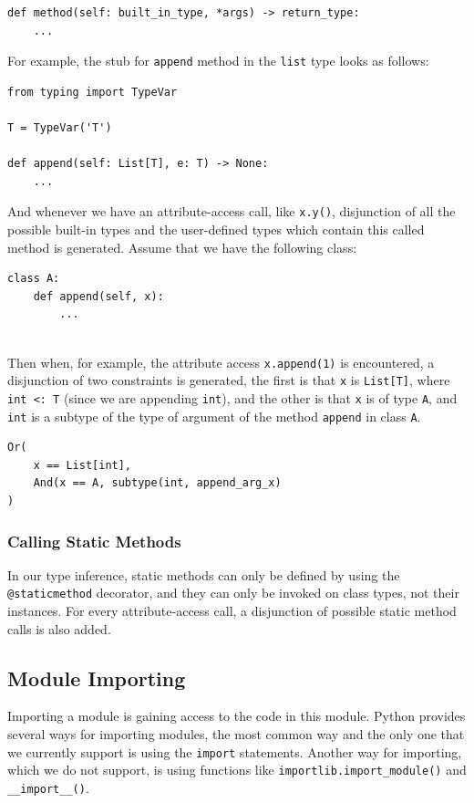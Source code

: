 \begin{lstlisting}
def method(self: built_in_type, *args) -> return_type:
	...
\end{lstlisting}
For example, the stub for \lstinline|append| method in the \lstinline|list| type looks as follows:

\begin{lstlisting}
from typing import TypeVar

T = TypeVar('T')

def append(self: List[T], e: T) -> None:
	...
\end{lstlisting}

And whenever we have an attribute-access call, like \lstinline|x.y()|, disjunction of all the possible built-in types and the user-defined types which contain this called method is generated. Assume that we have the following class:

\begin{lstlisting}
class A:
	def append(self, x):
		...
		
\end{lstlisting}

Then when, for example, the attribute access \lstinline|x.append(1)| is encountered, a disjunction of two constraints is generated, the first is that \lstinline|x| is \lstinline|List[T]|, where \lstinline|int <: T| (since we are appending \lstinline|int|), and the other is that \lstinline|x| is of type \lstinline|A|, and \lstinline|int| is a subtype of the type of argument of the method \lstinline|append| in class \lstinline|A|.

\begin{lstlisting}
Or(
	x == List[int],
	And(x == A, subtype(int, append_arg_x)
)
\end{lstlisting}

\subsubsection{Calling Static Methods}
In our type inference, static methods can only be defined by using the \lstinline|@staticmethod| decorator, and they can only be invoked on class types, not their instances. For every attribute-access call, a disjunction of possible static method calls is also added.

\subsection{Module Importing}
Importing a module is gaining access to the code in this module. Python provides several ways for importing modules, the most common way and the only one that we currently support is using the \lstinline|import| statements. Another way for importing, which we do not support, is using functions like \lstinline|importlib.import_module()| and \lstinline|__import__()|.

